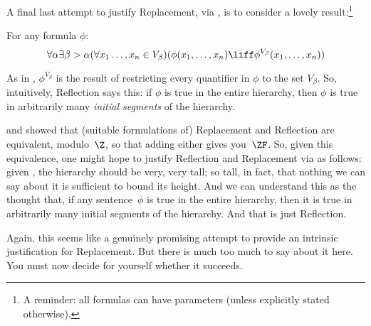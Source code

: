 \documentclass[../../../include/open-logic-section]{subfiles}
\begin{document}

A final last attempt to justify Replacement, via \stagesinex, is to
consider a lovely result:\footnote{A reminder: all formulas can have parameters (unless explicitly stated otherwise).}
\begin{thm}
For any formula $\phi$:
\[
\forall \alpha \exists \beta > \alpha (\forall x_1 \ldots, x_n \in
V_\beta)(\phi(x_1, \ldots, x_n) \liff \phi^{V_\beta}(x_1, \ldots, x_n))
\]
\end{thm}
\noindent 
As in , $\phi^{V_\beta}$ is the result of restricting every
quantifier in $\phi$ to the set $V_\beta$. So, intuitively, Reflection
says this: if $\phi$ is true in the entire hierarchy, then $\phi$ is
true in arbitrarily many \emph{initial segments} of the hierarchy. 

\citet{Montague1961} and \citet{Levy1960} showed that (suitable
formulations of) Replacement and Reflection are equivalent,
modulo~$\Z$, so that adding either gives you~$\ZF$. So, given this
equivalence, one might hope to justify Reflection  and Replacement via
\stagesinex{} as follows: given \stagesinex, the hierarchy should be
very, very tall; so tall, in fact, that nothing we can say about it is
sufficient to bound its height. And we can understand this as the
thought that, if any sentence~$\phi$ is true in the entire hierarchy,
then it is true in arbitrarily many initial segments of the hierarchy.
And that is just Reflection. 

Again, this seems like a genuinely promising attempt to provide an
intrinsic justification for Replacement. But there is much too much to
say about it here. You must now decide for yourself whether it
succeeds.
\end{document}
